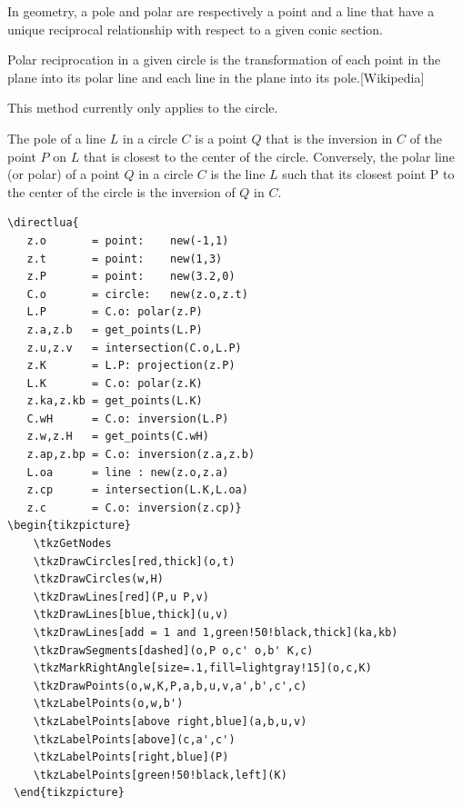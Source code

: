 In geometry, a pole and polar are respectively a point and a line that have a unique reciprocal relationship with respect to a given conic section.

Polar reciprocation in a given circle is the transformation of each point in the plane into its polar line and each line in the plane into its pole.[Wikipedia]

This method currently only applies to the circle. 

The pole of a line $L$ in a circle $C$ is a point $Q$ that is the inversion in $C$ of the point $P$ on $L$ that is closest to the center of the circle. Conversely, the polar line (or polar) of a point $Q$ in a circle $C$ is the line $L$ such that its closest point P to the center of the circle is the inversion of $Q$ in $C$.

\begin{Verbatim}
\directlua{
   z.o       = point:    new(-1,1)
   z.t       = point:    new(1,3)
   z.P       = point:    new(3.2,0)
   C.o       = circle:   new(z.o,z.t)
   L.P       = C.o: polar(z.P)
   z.a,z.b   = get_points(L.P)
   z.u,z.v   = intersection(C.o,L.P)
   z.K       = L.P: projection(z.P)
   L.K       = C.o: polar(z.K)
   z.ka,z.kb = get_points(L.K)
   C.wH      = C.o: inversion(L.P)
   z.w,z.H   = get_points(C.wH)
   z.ap,z.bp = C.o: inversion(z.a,z.b)
   L.oa      = line : new(z.o,z.a)
   z.cp      = intersection(L.K,L.oa)
   z.c       = C.o: inversion(z.cp)}
\begin{tikzpicture}
    \tkzGetNodes    
    \tkzDrawCircles[red,thick](o,t)
    \tkzDrawCircles(w,H)
    \tkzDrawLines[red](P,u P,v)
    \tkzDrawLines[blue,thick](u,v)
    \tkzDrawLines[add = 1 and 1,green!50!black,thick](ka,kb)
    \tkzDrawSegments[dashed](o,P o,c' o,b' K,c)
    \tkzMarkRightAngle[size=.1,fill=lightgray!15](o,c,K)
    \tkzDrawPoints(o,w,K,P,a,b,u,v,a',b',c',c)
    \tkzLabelPoints(o,w,b')
    \tkzLabelPoints[above right,blue](a,b,u,v)
    \tkzLabelPoints[above](c,a',c')
    \tkzLabelPoints[right,blue](P)
    \tkzLabelPoints[green!50!black,left](K)
 \end{tikzpicture}
\end{Verbatim}

